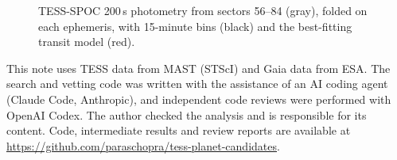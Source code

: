 \documentclass{aastex701}
\begin{document}
\begin{figure}[ht!]
\caption{TESS-SPOC 200\,s photometry from sectors 56--84 (gray), folded on each ephemeris, with 15-minute bins (black) and the best-fitting transit model (red).\label{fig:fold}}
\end{figure}

\begin{acknowledgments}
This note uses TESS data from MAST (STScI) and Gaia data from ESA. The search and vetting code was written with the assistance of an AI coding agent (Claude Code, Anthropic), and independent code reviews were performed with OpenAI Codex. The author checked the analysis and is responsible for its content. Code, intermediate results and review reports are available at \url{https://github.com/paraschopra/tess-planet-candidates}.
\end{acknowledgments}


{}

\end{document}
